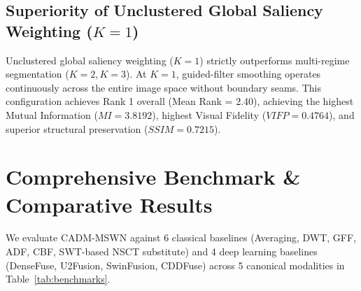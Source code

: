 \documentclass[conference]{IEEEtran}
\begin{document}
\subsection{Superiority of Unclustered Global Saliency Weighting ($K=1$)}
Unclustered global saliency weighting ($K=1$) strictly outperforms multi-regime segmentation ($K=2, K=3$). At $K=1$, guided-filter smoothing operates continuously across the entire image space without boundary seams. This configuration achieves Rank 1 overall (Mean Rank = 2.40), achieving the highest Mutual Information ($MI = 3.8192$), highest Visual Fidelity ($VIFP = 0.4764$), and superior structural preservation ($SSIM = 0.7215$).

\section{Comprehensive Benchmark \& Comparative Results}
We evaluate CADM-MSWN against 6 classical baselines (Averaging, DWT, GFF, ADF, CBF, SWT-based NSCT substitute) and 4 deep learning baselines (DenseFuse, U2Fusion, SwinFusion, CDDFuse) across 5 canonical modalities in Table~\ref{tab:benchmarks}.
\end{document}
